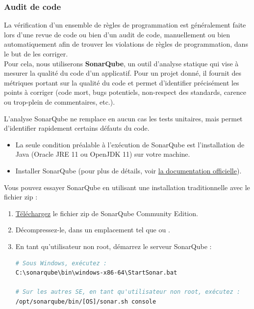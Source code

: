 \subsubsection{Audit de code}
La vérification d'un ensemble de règles de programmation est généralement faite lors d'une revue de code ou bien d'un audit de code, manuellement ou bien automatiquement afin de trouver les violations de règles de programmation, dans le but de les corriger.\\
Pour cela, nous utiliserons \textbf{SonarQube}, un outil d'analyse statique qui vise à mesurer la qualité du code d’un applicatif. Pour un projet donné, il fournit des métriques portant sur la qualité du code et permet d’identifier précisément les points à corriger (code mort, bugs potentiels, non-respect des standards, carence ou trop-plein de commentaires, etc.).
\begin{beware}[borderline west={5pt}{0pt}{red}, coltitle={red}, title=Remarque : ]
L'analyse SonarQube ne remplace en aucun cas les tests unitaires, mais permet d'identifier rapidement certains défauts du code.
\end{beware}
\begin{itemize}
    \item La seule condition préalable à l'exécution de SonarQube est l'installation de Java (Oracle JRE 11 ou OpenJDK 11) sur votre machine.
    \item Installer SonarQube (pour plus de détails, voir \href{https://docs.sonarqube.org/latest/setup/overview/}{la documentation officielle}).
\end{itemize}
Vous pouvez essayer SonarQube en utilisant une installation traditionnelle avec le fichier zip :
\begin{enumerate}
    \item \href{https://www.sonarqube.org/downloads/}{Téléchargez} le fichier zip de SonarQube Community Edition.
    \item Décompressez-le, dans un emplacement tel que  ou .
    \item En tant qu'utilisateur non root, démarrez le serveur SonarQube :
\begin{lstlisting}[numbers=none,language=bash]
# Sous Windows, exécutez :
C:\sonarqube\bin\windows-x86-64\StartSonar.bat

# Sur les autres SE, en tant qu'utilisateur non root, exécutez :
/opt/sonarqube/bin/[OS]/sonar.sh console
\end{lstlisting}
\end{enumerate}
